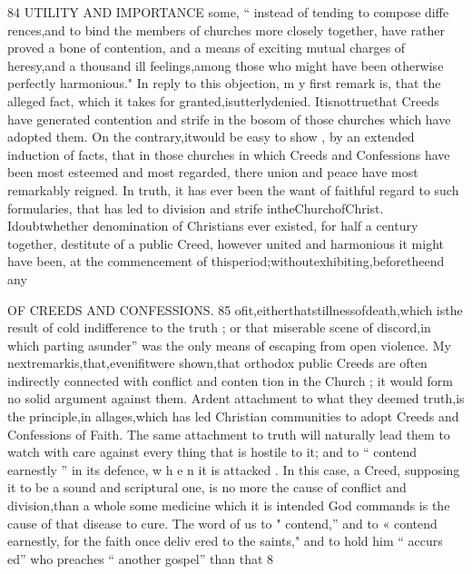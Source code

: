 \documentclass[
]{book}
\begin{document}
84 UTILITY AND IMPORTANCE
some, `` instead of tending to compose diffe rences,and to bind the members of churches
more closely together, have rather proved a bone of contention, and a means of exciting
mutual charges of heresy,and a thousand ill feelings,among those who might have been
otherwise perfectly harmonious."
In reply to this objection, m y first remark
is, that the alleged fact, which it takes for
granted,isutterlydenied. Itisnottruethat
Creeds have generated contention and strife
in the bosom of those churches which have
adopted them. On the contrary,itwould be easy to show , by an extended induction of
facts, that in those churches in which Creeds and Confessions have been most esteemed and
most regarded, there union and peace have most remarkably reigned. In truth, it has ever been the want of faithful regard to such formularies, that has led to division and strife intheChurchofChrist. Idoubtwhether
denomination of Christians ever existed, for
half a century together, destitute of a public Creed, however united and harmonious it
might have been, at the commencement of thisperiod;withoutexhibiting,beforetheend
any

OF CREEDS AND CONFESSIONS. 85
ofit,eitherthatstillnessofdeath,which isthe
result of cold indifference to the truth ; or that
miserable scene of discord,in which parting
asunder'' was the only means of escaping from open violence.
My nextremarkis,that,evenifitwere shown,that orthodox public Creeds are often indirectly connected with conflict and conten
tion in the Church ; it would form no solid
argument against them. Ardent attachment
to what they deemed truth,is the principle,in
allages,which has led Christian communities
to adopt Creeds and Confessions of Faith.
The same attachment to truth will naturally lead them to watch with care against every
thing that is hostile to it; and to `` contend earnestly '' in its defence, w h e n it is attacked .
In this case, a Creed, supposing it to be a sound and scriptural one, is no
more the cause of conflict and division,than a whole
some medicine which it is intended
God commands
is the cause of that disease to cure. The word of us to " contend,'' and to
« contend earnestly, for the faith once deliv ered to the saints," and to hold him `` accurs
ed'' who preaches `` another gospel'' than that
8
\end{document}
